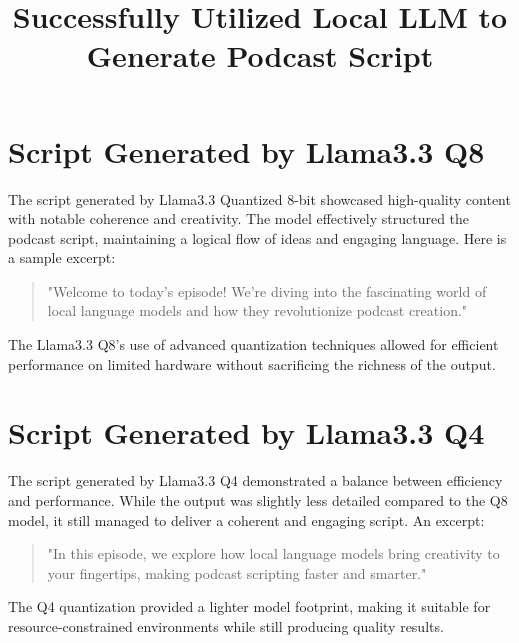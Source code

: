 \documentclass[12pt]{article}
\title{Successfully Utilized Local LLM to Generate Podcast Script}
\author{}
\date{}
\begin{document}
\maketitle

\section{Script Generated by Llama3.3 Q8}
The script generated by Llama3.3 Quantized 8-bit showcased high-quality content with notable coherence and creativity. The model effectively structured the podcast script, maintaining a logical flow of ideas and engaging language. Here is a sample excerpt:

\begin{quote}
"Welcome to today’s episode! We're diving into the fascinating world of local language models and how they revolutionize podcast creation."
\end{quote}

The Llama3.3 Q8's use of advanced quantization techniques allowed for efficient performance on limited hardware without sacrificing the richness of the output.

\section{Script Generated by Llama3.3 Q4}
The script generated by Llama3.3 Q4 demonstrated a balance between efficiency and performance. While the output was slightly less detailed compared to the Q8 model, it still managed to deliver a coherent and engaging script. An excerpt:

\begin{quote}
"In this episode, we explore how local language models bring creativity to your fingertips, making podcast scripting faster and smarter."
\end{quote}

The Q4 quantization provided a lighter model footprint, making it suitable for resource-constrained environments while still producing quality results.
\end{document}
